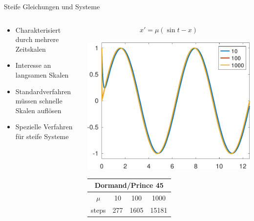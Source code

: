 \documentclass[notheorems,hidelinks,aspectratio=1610]{beamer}
\begin{document}
\begin{frame}{Steife Gleichungen und Systeme}
  \begin{columns}
    \begin{column}{.5\textwidth}
      \begin{itemize}
      \item Charakterisiert durch mehrere Zeitskalen
      \item Interesse an langsamen Skalen
      \item Standardverfahren müssen schnelle Skalen auflösen
      \item Spezielle Verfahren für steife Systeme
      \end{itemize}
    \end{column}
    \begin{column}{.5\textwidth}
      \begin{gather*}
        x' = \mu(\sin t- x)
      \end{gather*}
      \begin{center}
        \includegraphics[width=.8\textwidth]{fig/stiff-crop.pdf}

        \footnotesize
        
        \begin{tabular}{|c|ccc|}
          \hline \multicolumn{4}{|c|}{Dormand/Prince 45}\\\hline
          $\mu$ & 10 & 100 & 1000\\
          steps & 277 & 1605 & 15181\\\hline
        \end{tabular}
      \end{center}
    \end{column}
  \end{columns}
\end{frame}
\end{document}
